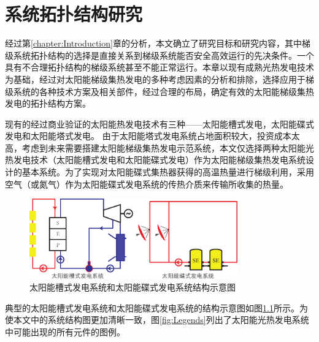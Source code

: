 \chapter{系统拓扑结构研究}
\label{cha:SystemTopology}

经过第\ref{chapter:Introduction}章的分析，本文确立了研究目标和研究内容，其中梯级系统拓扑结构的选择是直接关系到梯级系统能否安全高效运行的先决条件。一个具有不合理拓扑结构的梯级系统甚至不能正常运行。本章以现有成熟光热发电技术为基础，经过对太阳能梯级集热发电的多种考虑因素的分析和排除，选择应用于梯级系统的各种技术方案及相关部件，经过合理的布局，确定有效的太阳能梯级集热发电的拓扑结构方案。

现有的经过商业验证的太阳能热发电技术有三种——太阳能槽式发电，太阳能碟式发电和太阳能塔式发电。
由于太阳能塔式发电系统占地面积较大，投资成本太高，考虑到未来需要搭建太阳能梯级集热发电示范系统，本文仅选择两种太阳能光热发电技术（太阳能槽式发电和太阳能碟式发电）作为太阳能梯级集热发电系统设计的基本系统。为了实现对太阳能碟式集热器获得的高温热量进行梯级利用，采用空气（或氮气）作为太阳能碟式发电系统的传热介质来传输所收集的热量。
\begin{figure}[htbp]
\centering
\includegraphics[width=0.8\textwidth]{fig/PTPD.pdf}
\caption{太阳能槽式发电系统和太阳能碟式发电系统结构示意图}
\label{fig:PTPD}
\end{figure}
典型的太阳能槽式发电系统和太阳能碟式发电系统的结构示意图如图\ref{fig:PTPD}所示。为使本文中的系统结构图更加清晰一致，图\ref{fig:Legends}列出了太阳能光热发电系统中可能出现的所有元件的图例。

